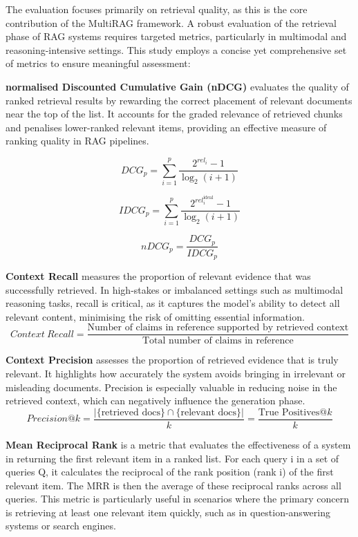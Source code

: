\documentclass[12pt,twoside]{report}
\begin{document}
The evaluation focuses primarily on retrieval quality, as this is the core contribution of the MultiRAG framework. A robust evaluation of the retrieval phase of RAG systems requires targeted metrics, particularly in multimodal and reasoning-intensive settings. This study employs a concise yet comprehensive set of metrics to ensure meaningful assessment:

\textbf{normalised Discounted Cumulative Gain (nDCG)} evaluates the quality of ranked retrieval results by rewarding the correct placement of relevant documents near the top of the list. It accounts for the graded relevance of retrieved chunks and penalises lower-ranked relevant items, providing an effective measure of ranking quality in RAG pipelines.

$$DCG_p = \sum_{i=1}^{p} \frac{2^{rel_i} - 1}{\log_2(i+1)}$$

$$IDCG_p = \sum_{i=1}^{p} \frac{2^{rel_i^{\text{ideal}}} - 1}{\log_2(i+1)}$$  

$$nDCG_p = \frac{DCG_p}{IDCG_p}$$

\textbf{Context Recall} measures the proportion of relevant evidence that was successfully retrieved. In high-stakes or imbalanced settings such as multimodal reasoning tasks, recall is critical, as it captures the model's ability to detect all relevant content, minimising the risk of omitting essential information. \\

$$Context~Recall = \frac{\text{Number of claims in reference supported by retrieved context}}{\text{Total number of claims in reference}}$$

\textbf{Context Precision} assesses the proportion of retrieved evidence that is truly relevant. It highlights how accurately the system avoids bringing in irrelevant or misleading documents. Precision is especially valuable in reducing noise in the retrieved context, which can negatively influence the generation phase. \\

$$Precision@k = \frac{|\{\text{retrieved docs}\} \cap \{\text{relevant docs}\}|}{k} = \frac{\text{True Positives}@k}{k}$$

\textbf{Mean Reciprocal Rank} is a metric that evaluates the effectiveness of a system in returning the first relevant item in a ranked list. For each query i in a set of queries 
Q, it calculates the reciprocal of the rank position (rank i) of the first relevant item. The MRR is then the average of these reciprocal ranks across all queries. This metric is particularly useful in scenarios where the primary concern is retrieving at least one relevant item quickly, such as in question-answering systems or search engines.
\end{document}
